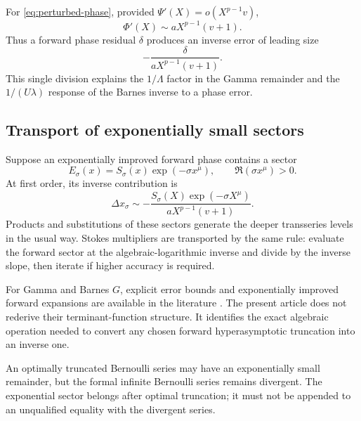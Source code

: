 \documentclass[11pt,oneside]{article}
\theoremstyle{plain}
\theoremstyle{definition}
\theoremstyle{remark}
\begin{document}
For \cref{eq:perturbed-phase}, provided \(\Psi'(X)=o(X^{p-1}v)\),
\begin{equation}
 \Phi'(X)\sim aX^{p-1}(v+1).
 \label{eq:asymptotic-inverse-slope}
\end{equation}
Thus a forward phase residual \(\delta\) produces an inverse error of leading
size
\begin{equation}
 -\frac{\delta}{aX^{p-1}(v+1)}.
 \label{eq:phase-error-division}
\end{equation}
This single division explains the \(1/\Lambda\) factor in the Gamma remainder
and the \(1/(U\lambda)\) response of the Barnes inverse to a phase error.

\subsection{Transport of exponentially small sectors}

Suppose an exponentially improved forward phase contains a sector
\begin{equation}
 E_\sigma(x)=S_\sigma(x)\exp(-\sigma x^\mu),
 \qquad \Re(\sigma x^\mu)>0.
 \label{eq:forward-exponential-sector}
\end{equation}
At first order, its inverse contribution is
\begin{equation}
 \Delta x_\sigma
 \sim-\frac{S_\sigma(X)\exp(-\sigma X^\mu)}
 {aX^{p-1}(v+1)}.
 \label{eq:inverse-exponential-sector}
\end{equation}
Products and substitutions of these sectors generate the deeper transseries
levels in the usual way.  Stokes multipliers are transported by the same
rule: evaluate the forward sector at the algebraic-logarithmic inverse and
divide by the inverse slope, then iterate if higher accuracy is required.

For Gamma and Barnes \(G\), explicit error bounds and exponentially improved
forward expansions are available in the literature
\cite{NemesGamma,NemesBarnes}.  The present article does not rederive their
terminant-function structure.  It identifies the exact algebraic operation
needed to convert any chosen forward hyperasymptotic truncation into an inverse
one.

\begin{warningbox}
An optimally truncated Bernoulli series may have an exponentially small
remainder, but the formal infinite Bernoulli series remains divergent.  The
exponential sector belongs after optimal truncation; it must not be appended
to an unqualified equality with the divergent series.
\end{warningbox}
\end{document}
